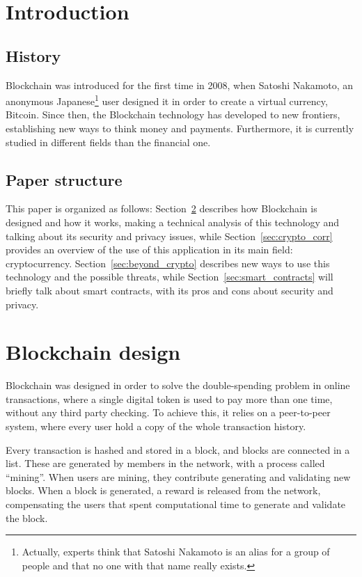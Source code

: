 \section{Introduction}

\subsection{History}
Blockchain was introduced for the first time in 2008, when Satoshi
Nakamoto, an anonymous Japanese\footnote{Actually, experts think that Satoshi
Nakamoto is an alias for a group of people and that no one with that name
really exists.} user designed it in order to create a virtual currency,
Bitcoin. Since then, the Blockchain technology has developed to new frontiers,
establishing new ways to think money and payments. Furthermore, it is currently
studied in different fields than the financial one.

\subsection{Paper structure}

This paper is organized as follows: Section~\ref{sec:block_design} describes
how Blockchain is designed and how it works, making a technical analysis of this
technology and talking about its security and privacy issues, while
Section~\ref{sec:crypto_corr} provides an overview of the
use of this application in its main field: cryptocurrency.
Section~\ref{sec:beyond_crypto} describes new ways to use this technology and
the possible threats, while Section~\ref{sec:smart_contracts} will briefly talk
about smart contracts, with its pros and cons about security and privacy.

\section{Blockchain design}
\label{sec:block_design}
Blockchain was designed in order to solve the double-spending problem in
online transactions, where a single digital token is used to pay more than one
time, without any third party checking\cite{nakamoto08}. To achieve this, it
relies on a peer-to-peer system, where every user hold a copy of the whole
transaction history.

Every transaction is hashed and stored in a block, and blocks are connected in
a list. These are generated by members in the network, with a process called
``mining''. When users are mining, they contribute generating and validating
new blocks. When a block is generated, a reward is released from the network,
compensating the users that spent computational time to generate and validate
the block.

